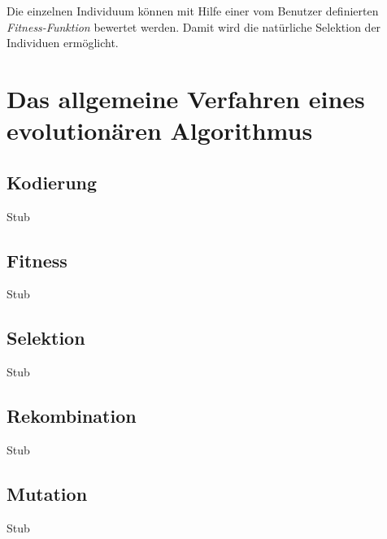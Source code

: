Die einzelnen Individuum können mit Hilfe einer vom Benutzer definierten \textit{Fitness-Funktion} bewertet werden. Damit wird die natürliche Selektion der Individuen ermöglicht. 








\section{Das allgemeine Verfahren eines evolutionären Algorithmus}


\subsection{Kodierung}
Stub

\subsection{Fitness}
Stub

\subsection{Selektion}
Stub

\subsection{Rekombination}
Stub

\subsection{Mutation}
Stub
